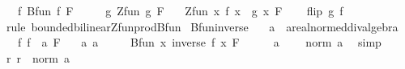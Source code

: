 \begin{isabellebody}
\ \ \ f{\isacharcolon}{\kern0pt}\ {\isachardoublequoteopen}Bfun\ f\ F{\isachardoublequoteclose}\isanewline
\ \ \ \ \ g{\isacharcolon}{\kern0pt}\ {\isachardoublequoteopen}Zfun\ g\ F{\isachardoublequoteclose}\isanewline
\ \ \ {\isachardoublequoteopen}Zfun\ {\isacharparenleft}{\kern0pt}{\isasymlambda}x{\isachardot}{\kern0pt}\ f\ x\ {\isacharasterisk}{\kern0pt}{\isacharasterisk}{\kern0pt}\ g\ x{\isacharparenright}{\kern0pt}\ F{\isachardoublequoteclose}\isanewline
%
\isadelimproof
\ \ %
\endisadelimproof
%
\isatagproof
{}\isamarkupfalse%
\ flip\ g\ f\ \isamarkupfalse%
\ {\isacharparenleft}{\kern0pt}rule\ bounded{\isacharunderscore}{\kern0pt}bilinear{\isachardot}{\kern0pt}Zfun{\isacharunderscore}{\kern0pt}prod{\isacharunderscore}{\kern0pt}Bfun{\isacharparenright}{\kern0pt}%
\endisatagproof
{\isafoldproof}%
%
\isadelimproof
\isanewline
%
\endisadelimproof
\isanewline
{}\isamarkupfalse%
\ Bfun{\isacharunderscore}{\kern0pt}inverse{\isacharcolon}{\kern0pt}\isanewline
\ \ \ a\ {\isacharcolon}{\kern0pt}{\isacharcolon}{\kern0pt}\ {\isachardoublequoteopen}{\isacharprime}{\kern0pt}a{\isacharcolon}{\kern0pt}{\isacharcolon}{\kern0pt}real{\isacharunderscore}{\kern0pt}normed{\isacharunderscore}{\kern0pt}div{\isacharunderscore}{\kern0pt}algebra{\isachardoublequoteclose}\isanewline
\ \ \ f{\isacharcolon}{\kern0pt}\ {\isachardoublequoteopen}{\isacharparenleft}{\kern0pt}f\ {\isasymlonglongrightarrow}\ a{\isacharparenright}{\kern0pt}\ F{\isachardoublequoteclose}\isanewline
\ \ \ a{\isacharcolon}{\kern0pt}\ {\isachardoublequoteopen}a\ {\isasymnoteq}\ {}{\isachardoublequoteclose}\isanewline
\ \ \ {\isachardoublequoteopen}Bfun\ {\isacharparenleft}{\kern0pt}{\isasymlambda}x{\isachardot}{\kern0pt}\ inverse\ {\isacharparenleft}{\kern0pt}f\ x{\isacharparenright}{\kern0pt}{\isacharparenright}{\kern0pt}\ F{\isachardoublequoteclose}\isanewline
%
\isadelimproof
%
\endisadelimproof
%
\isatagproof
{}\isamarkupfalse%
\ {\isacharminus}{\kern0pt}\isanewline
\ \ \isamarkupfalse%
\ a\ \isamarkupfalse%
\ {\isachardoublequoteopen}{}\ {\isacharless}{\kern0pt}\ norm\ a{\isachardoublequoteclose}\ \isamarkupfalse%
\ simp\isanewline
\ \ \isamarkupfalse%
\ \isamarkupfalse%
\ {\isachardoublequoteopen}{\isasymexists}r{\isachargreater}{\kern0pt}{}{\isachardot}{\kern0pt}\ r\ {\isacharless}{\kern0pt}\ norm\ a{\isachardoublequoteclose}\ \isamarkupfalse%

\end{isabellebody}
